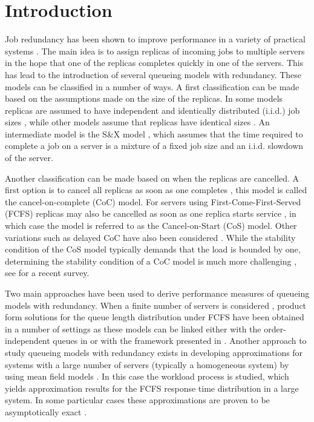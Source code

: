 \documentclass[acmsmall,nonacm]{acmart}
\begin{document}
\section{Introduction}
Job redundancy has been shown to improve performance in a variety of practical systems \cite{dolly,dean2013,vulimiri2013}.
The main idea is to assign replicas of incoming jobs to multiple servers in the hope that one of the
replicas completes quickly in one of the servers. This has lead to the introduction of several queueing models with redundancy. These models can be classified in a number of ways. A first classification can be made based on the assumptions made on the size of the replicas. In some models replicas are
assumed to have independent and identically distributed (i.i.d.) job sizes \cite{gardner2015reducing,gardner2017redundancy,anton2021stability,BONALD201770}, while other models assume that replicas have identical sizes \cite{anton2021stability,raaijmakers_PS,Hellemans_indentical}. An intermediate model is the S\&X model \cite{gardner2017better}, which assumes that the time required to complete a job on a server is a mixture of a fixed job size and an i.i.d. slowdown of the server.

Another classification can be made based on when the replicas are cancelled. A first option is to
cancel all replicas as soon as one completes \cite{gardner2015reducing,gardner2017redundancy,Hellemans_indentical,anton2021stability,raaijmakers_PS,BONALD201770}, this model is called the cancel-on-complete (CoC) model. For servers using First-Come-First-Served (FCFS) replicas may also be cancelled as soon as one replica starts service \cite{hellemansSIG18,ayesta_unifying}, in which case the model is referred to as the Cancel-on-Start (CoS) model. Other variations such as delayed CoC have also been considered \cite{Hellemans_workload}.
While the stability condition of the CoS model typically demands that the load is bounded by one, 
determining the stability condition of a CoC model is much more challenging \cite{gardner2017redundancy,raaijmakers2020,raaijmakers_PS,anton2021stability}, see
\cite{anton_survey} for a recent survey. 

Two main approaches have been used to derive performance measures of queueing models 
with redundancy. When a finite number of servers is considered \cite{gardner2015reducing,gardner2017redundancy,BONALD201770}, product form
solutions for the queue length distribution under FCFS have been obtained in a number of settings  as these models can be linked either with the order-independent queues in \cite{Krzesinski2011} or with the framework presented in \cite{visschers2012product}. Another approach to study queueing models
with redundancy exists in developing approximations for systems
with a large number of servers (typically a homogeneous system) by using mean field models \cite{gardner2017redundancy,Hellemans_workload,hellemansSIG18,Hellemans_indentical, shneer2020large}.
In this case the workload process is studied, which yields approximation results for
the FCFS response time distribution in a large system. In some particular cases these
approximations are proven to be asymptotically exact \cite{shneer2020large}.
\end{document}
